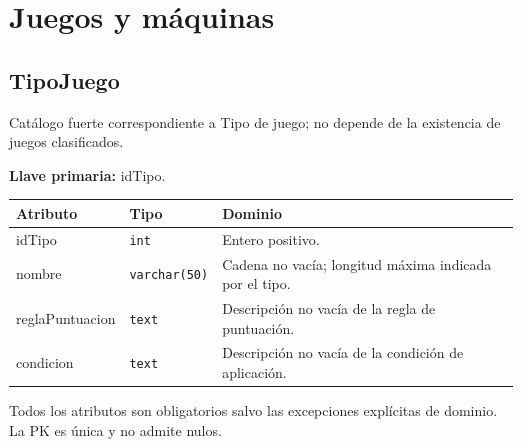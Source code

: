 \section{Juegos y máquinas}
\par\noindent\begin{minipage}{\textwidth}
\subsection{TipoJuego}
Catálogo fuerte correspondiente a Tipo de juego; no depende de la existencia de juegos clasificados.\par
\textbf{Llave primaria:} idTipo.\par
{\small\begin{tabular}{@{}p{}p{}p{}@{}}
\toprule Atributo & Tipo & Dominio \\ \midrule
idTipo & \texttt{int} & Entero positivo. \\
nombre & \texttt{varchar(50)} & Cadena no vacía; longitud máxima indicada por el tipo. \\
reglaPuntuacion & \texttt{text} & Descripción no vacía de la regla de puntuación. \\
condicion & \texttt{text} & Descripción no vacía de la condición de aplicación. \\
\bottomrule\end{tabular}}
Todos los atributos son obligatorios salvo las excepciones explícitas de dominio. La PK es única y no admite nulos.
\end{minipage}\par\vspace{.35cm}
